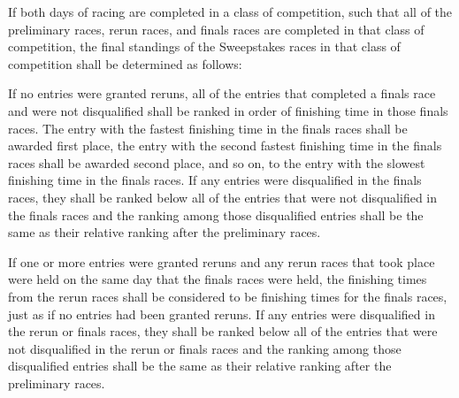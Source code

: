 	If both days of racing are completed in a class of competition, such that all
	of the preliminary races, rerun races, and finals races are completed in that
	class of competition, the final standings of the Sweepstakes races in that
	class of competition shall be determined as follows:
	\newline

	If no entries were granted reruns, all of the entries that completed a finals
	race and were not disqualified shall be ranked in order of finishing time in
	those finals races. The entry with the fastest finishing time in the finals
	races shall be awarded first place, the entry with the second fastest finishing
	time in the finals races shall be awarded second place, and so on, to the entry
	with the slowest finishing time in the finals races. If any entries were
	disqualified in the finals races, they shall be ranked below all of the entries
	that were not disqualified in the finals races and the ranking among those
	disqualified entries shall be the same as their relative ranking after the
	preliminary races.

	If one or more entries were granted reruns and any rerun races that took place
	were held on the same day that the finals races were held, the finishing times
	from the rerun races shall be considered to be finishing times for the finals
	races, just as if no entries had been granted reruns. If any entries were
	disqualified in the rerun or finals races, they shall be ranked below all of
	the entries that were not disqualified in the rerun or finals races and the
	ranking among those disqualified entries shall be the same as their relative
	ranking after the preliminary races.


